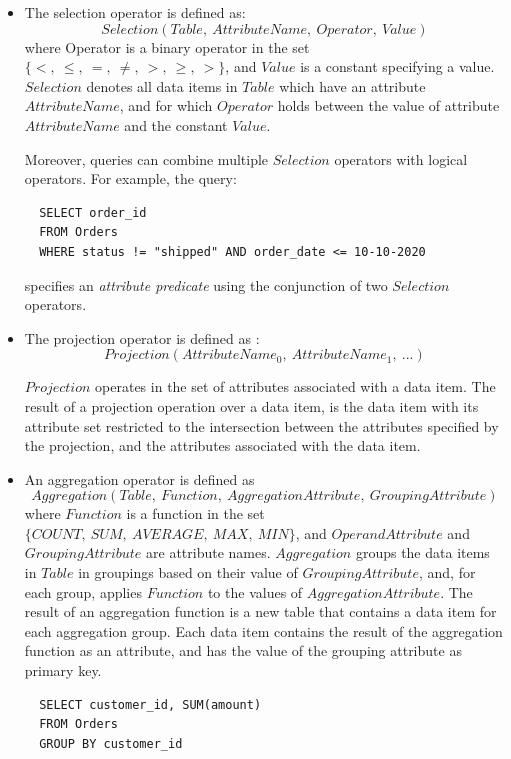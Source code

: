 \begin{itemize}
  \item The selection operator is defined as:
  \[
  Selection(Table,~AttributeName,~Operator,~Value)
  \]
  where Operator is a binary operator in the set $\{<,~\leq,~=,~\neq,~>,~\geq,~>\}$,
  and $Value$ is a constant specifying a value.
  $Selection$ denotes all data items in $Table$ which
  have an attribute $AttributeName$,
  and for which $Operator$ holds between the value of attribute $AttributeName$ and the constant $Value$.

  Moreover, queries can combine multiple $Selection$ operators with logical operators.
  For example, the query:

  \begin{lstlisting}
  SELECT order_id
  FROM Orders
  WHERE status != "shipped" AND order_date <= 10-10-2020
  \end{lstlisting}

  specifies an \textit{attribute predicate} using the conjunction of two $Selection$ operators.

  \item The projection operator is defined as :
  \[
  Projection(AttributeName_0,~AttributeName_1,~...)
  \]

  $Projection$ operates in the set of attributes associated with a data item.
  The result of a projection operation over a data item, is the data item with its attribute set restricted to the
  intersection between the attributes specified by the projection, and the attributes associated with the data item.

  \item An aggregation operator is defined as
  \[
  Aggregation(Table,~Function,~AggregationAttribute,~GroupingAttribute)
  \]
  where $Function$ is a function in the set $\{COUNT,~SUM,~AVERAGE,~MAX,~MIN\}$,
  and $OperandAttribute$ and $GroupingAttribute$ are attribute names.
  $Aggregation$ groups the data items in $Table$ in groupings based on their value of $GroupingAttribute$,
  and, for each group, applies $Function$ to the values of $AggregationAttribute$.
  The result of an aggregation function is a new table that contains a data item for each aggregation group.
  Each data item contains the result of the aggregation function as an attribute, and has the value of the grouping attribute as primary key.

  \begin{lstlisting}
  SELECT customer_id, SUM(amount)
  FROM Orders
  GROUP BY customer_id
  \end{lstlisting}


\end{itemize}
